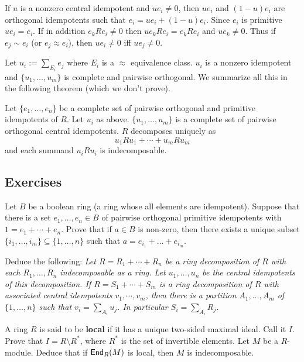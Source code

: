 If $u$ is a nonzero central idempotent and $ue_i \neq 0$, then $ue_i$ and $(1-u)e_i$ are orthogonal idempotents such that $e_i=ue_i+(1-u)e_i$. 
Since $e_i$ is primitive $ue_i=e_i$. 
If in addition $e_k R e_i \neq 0$ then $ue_k R e_i=e_k R e_i$ and $ue_k \neq 0$. 
Thus if $e_j \sim e_i$ (or $e_j \approx e_i$), then $ue_i \neq 0$ iff $ue_j \neq 0$. 

Let $u_i :=\sum_{E_i} e_j$ where $E_i$ is a $\approx$ equivalence class. $u_i$ is a nonzero idempotent and $\{u_1, \ldots, u_m\}$ is complete and pairwise orthogonal. 
We summarize all this in the following theorem (which we don't prove). 

\begin{thm}
Let $\{e_1, \ldots, e_n\}$ be a complete set of pairwise orthogonal and primitive idempotents of $R$.
Let $u_i$ as above. 
$\{u_1, \ldots, u_m\}$ is a complete set of pairwise orthogonal central idempotents. 
$R$ decomposes uniquely as 
$$u_1 R u_1 + \cdots + u_m R u_m$$
and each summand $u_iRu_i$ is indecomposable. 

\end{thm}

\subsection*{Exercises}
\begin{ex}
\label{boolean}
Let $B$ be a boolean ring (a ring whose all elements are idempotent).
Suppose that there is a set $e_1, \ldots , e_n \in B$ of pairwise orthogonal primitive idempotents with $1= e_1 + \cdots +e_n$. 
Prove that if $a \in B$ is non-zero, then there exists a unique subset $\{i_1,\ldots,i_m\} \subseteq \{1,\ldots,n\}$ such that $a= e_{i_1} +\ldots+e_{i_m}$.

Deduce the following: 
\textit{Let $R = R_1 + \cdots +R_n$ be a ring decomposition of $R$ with each $R_1,\ldots ,R_n$ indecomposable as a ring.
Let $u_1, \ldots, u_n$ be the central idempotents of this decomposition. 
If $R = S_1 +\cdots + S_m$ is a ring decomposition of $R$ with associated central idempotents $v_1 ,\cdots, v_m$, then there is a partition $A_1,\ldots, A_m$ of $\{1,\ldots,n\}$ such that $v_i = \sum_{A_i} u_j$. 
In particular $S_i = \sum_{A_i} R_j$.}
\end{ex}

\begin{ex}
A ring $R$ is said to be \textbf{local} if it has a unique two-sided maximal ideal. 
Call it $I$. 
Prove that $I=R\setminus R^{\ast}$, where $R^{\ast}$ is the set of invertible elements. 
Let $M$ be a $R$-module. 
Deduce that if $\operatorname{\sf{End}}_R(M)$ is local, then $M$ is indecomposable.
\end{ex}
